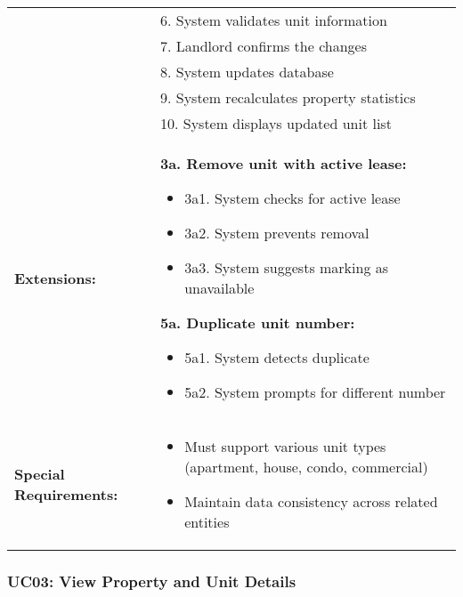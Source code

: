 \documentclass[12pt]{article}
\begin{document}
\begin{longtable}{|p{3cm}|p{11cm}|}
& 6. System validates unit information \\
& 7. Landlord confirms the changes \\
& 8. System updates database \\
& 9. System recalculates property statistics \\
& 10. System displays updated unit list \\
\hline
\textbf{Extensions:} & 
\textbf{3a. Remove unit with active lease:}
\begin{itemize}
    \item 3a1. System checks for active lease
    \item 3a2. System prevents removal
    \item 3a3. System suggests marking as unavailable
\end{itemize}
\textbf{5a. Duplicate unit number:}
\begin{itemize}
    \item 5a1. System detects duplicate
    \item 5a2. System prompts for different number
\end{itemize} \\
\hline
\textbf{Special Requirements:} & 
\begin{itemize}
    \item Must support various unit types (apartment, house, condo, commercial)
    \item Maintain data consistency across related entities
\end{itemize} \\
\hline
\end{longtable}

\subsubsection{UC03: View Property and Unit Details}
\end{document}
